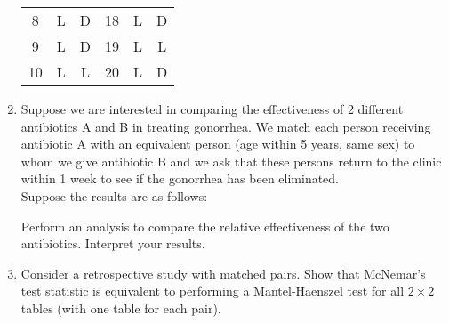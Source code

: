\documentclass[12pt]{article}
\begin{document}
\begin{enumerate}[Problem 1.]
\begin{center}
\begin{tabular}{cccccc}
8 & L & D & 18 & L & D \\
9 & L & D & 19 & L & L \\
10 & L & L & 20 & L & D \\ \hline
\end{tabular}
\end{center}
\item Suppose we are interested in comparing the effectiveness of 2 different
antibiotics A and B in treating gonorrhea.  We match each person receiving
antibiotic A with an equivalent person (age within 5 years, same sex) to whom we
give antibiotic B and we ask that these persons return to the clinic within 1 week
to see if the gonorrhea has been eliminated. \\
Suppose the results are as follows:
Perform an analysis to compare the relative effectiveness of the two
antibiotics.  Interpret your results.
\item Consider a retrospective study with matched pairs.  Show that McNemar's
test statistic is equivalent to performing a Mantel-Haenszel test for all
$2 \times 2$ tables (with one table for each pair).


\end{enumerate}
\end{document}
